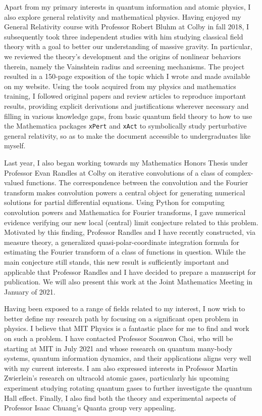 \documentclass[12pt]{article}
\begin{document}
Apart from my primary interests in quantum information and atomic physics, I also explore general relativity and mathematical physics. Having enjoyed my General Relativity course with Professor Robert Bluhm at Colby in fall 2018, I subsequently took three independent studies with him studying classical field theory with a goal to better our understanding of massive gravity. In particular, we reviewed the theory's development and the origins of nonlinear behaviors therein, namely the Vainshtein radius and screening mechanisms. The project resulted in a 150-page exposition of the topic which I wrote and made available on my website. Using the tools acquired from my physics and mathematics training, I followed original papers and review articles to reproduce important results, providing explicit derivations and justifications wherever necessary and filling in various knowledge gaps, from basic quantum field theory to how to use the Mathematica packages \texttt{xPert} and \texttt{xAct} to symbolically study perturbative general relativity, so as to make the document accessible to undergraduates like myself. \\ \vspace{-9pt}

Last year, I also began working towards my Mathematics Honors Thesis under Professor Evan Randles at Colby on iterative convolutions of a class of complex-valued functions. The correspondence between the convolution and the Fourier transform makes convolution powers a central object for generating numerical solutions for partial differential equations. Using Python for computing convolution powers and Mathematica for Fourier transforms, I gave numerical evidence verifying our new local (central) limit conjecture related to this problem. Motivated by this finding, Professor Randles and I have recently constructed, via measure theory, a generalized quasi-polar-coordinate integration formula for estimating the Fourier transform of a class of functions in question. While the main conjecture still stands, this new result is sufficiently important and applicable that Professor Randles and I have decided to prepare a manuscript for publication. We will also present this work at the Joint Mathematics Meeting in January of 2021. \\ \vspace{-9pt}

Having been exposed to a range of fields related to my  interest, I now wish to better define my research path by focusing on a significant open problem in physics. I believe that MIT Physics is a fantastic place for me to find and work on such a problem. I have contacted Professor Soonwon Choi, who will be starting at MIT in July 2021 and whose research on quantum many-body systems, quantum information dynamics, and their applications aligns very well with my current interests. I am also expressed interests in Professor Martin Zwierlein's research on ultracold atomic gases, particularly his upcoming experiment studying rotating quantum gases to further investigate the quantum Hall effect. Finally, I also find both the theory and experimental aspects of Professor Isaac Chuang's Quanta group very appealing.  \\ \vspace{-9pt}
\end{document}
